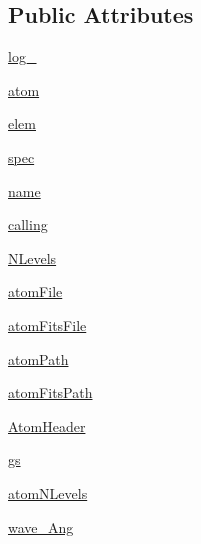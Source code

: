 \subsection*{Public Attributes}
\begin{DoxyCompactItemize}
\item 
\hyperlink{classpyneb_1_1core_1_1pynebcore_1_1___atom_data_fits_afd87151907f32bc0dc45f0171b61374e}{log\-\_\-}
\item 
\hyperlink{classpyneb_1_1core_1_1pynebcore_1_1___atom_data_fits_a0c5c7091b1d8a95d9bee2744d713f5c9}{atom}
\item 
\hyperlink{classpyneb_1_1core_1_1pynebcore_1_1___atom_data_fits_a62e73dc66c7aff7941c5ce94e808c23a}{elem}
\item 
\hyperlink{classpyneb_1_1core_1_1pynebcore_1_1___atom_data_fits_adaf1b66faf18504ec4b5c8c0b7f6763b}{spec}
\item 
\hyperlink{classpyneb_1_1core_1_1pynebcore_1_1___atom_data_fits_ab74e6bf80237ddc4109968cedc58c151}{name}
\item 
\hyperlink{classpyneb_1_1core_1_1pynebcore_1_1___atom_data_fits_ab25fa7ebe84b603684dee62410c1e34c}{calling}
\item 
\hyperlink{classpyneb_1_1core_1_1pynebcore_1_1___atom_data_fits_a4d45fe163c2108853ab418386bf4da56}{N\-Levels}
\item 
\hyperlink{classpyneb_1_1core_1_1pynebcore_1_1___atom_data_fits_afa3c4660b3bcf1e2c199413048b9209e}{atom\-File}
\item 
\hyperlink{classpyneb_1_1core_1_1pynebcore_1_1___atom_data_fits_a80c24f287a25f67b489b472164691ea6}{atom\-Fits\-File}
\item 
\hyperlink{classpyneb_1_1core_1_1pynebcore_1_1___atom_data_fits_a18178a28ecf0c7f251d0974c2097b214}{atom\-Path}
\item 
\hyperlink{classpyneb_1_1core_1_1pynebcore_1_1___atom_data_fits_a8d37532338fe8cf09d17000a7ae46d53}{atom\-Fits\-Path}
\item 
\hyperlink{classpyneb_1_1core_1_1pynebcore_1_1___atom_data_fits_ae68fbd160143b3e6fdcc01eeae6e1965}{Atom\-Header}
\item 
\hyperlink{classpyneb_1_1core_1_1pynebcore_1_1___atom_data_fits_a7cdd347489383ef85cb3526af2a7a0aa}{gs}
\item 
\hyperlink{classpyneb_1_1core_1_1pynebcore_1_1___atom_data_fits_ae9ca7d9b8e6463826cd148ff606cbc1c}{atom\-N\-Levels}
\item 
\hyperlink{classpyneb_1_1core_1_1pynebcore_1_1___atom_data_fits_ab5130f33e76a12670614a4ecf47211b0}{wave\-\_\-\-Ang}
\end{DoxyCompactItemize}


